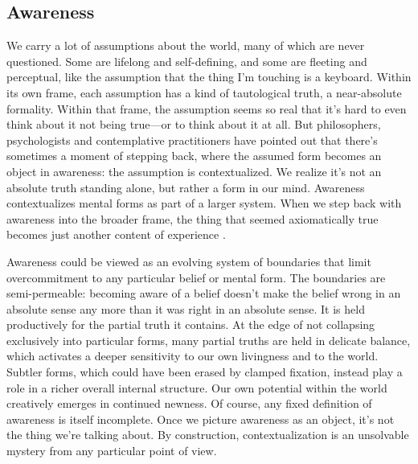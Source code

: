 \documentclass[11pt]{article}
\begin{document}
\subsection{Awareness}


We carry a lot of assumptions about the world, many of which are never questioned. Some are lifelong and self-defining, and some are fleeting and perceptual, like the assumption that the thing I'm touching is a keyboard. Within its own frame, each assumption has a kind of tautological truth, a near-absolute formality. Within that frame, the assumption seems so real that it's hard to even think about it not being true---or to think about it at all. But philosophers, psychologists and contemplative practitioners have pointed out that there's sometimes a moment of stepping back, where the assumed form becomes an object in awareness: the assumption is contextualized. We realize it's not an absolute truth standing alone, but rather a form in our mind. Awareness contextualizes mental forms as part of a larger system. When we step back with awareness into the broader frame, the thing that seemed axiomatically true becomes just another content of experience \citep{watts2011wisdom, jung1969archetypes, bodhi2000connected, wegner1994ironic,beisser1970paradoxical, wilber1996atman, suzuki1970zen, krishnamurti1969freedom, k2025harmony, kegan1982evolving}. 




Awareness could be viewed as an evolving system of boundaries that limit overcommitment to any particular belief or mental form. The boundaries are semi-permeable: becoming aware of a belief doesn't make the belief wrong in an absolute sense any more than it was right in an absolute sense. It is held productively for the partial truth it contains. At the edge of not collapsing exclusively into particular forms, many partial truths are held in delicate balance, which activates a deeper sensitivity to our own livingness and to the world. Subtler forms, which could have been erased by clamped fixation, instead play a role in a richer overall internal structure. Our own potential within the world creatively emerges in continued newness. Of course, any fixed definition of awareness is itself incomplete. Once we picture awareness as an object, it's not the thing we're talking about. By construction, contextualization is an unsolvable mystery from any particular point of view.
\end{document}

